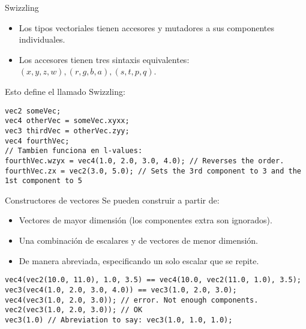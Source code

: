 \begin{frame}[fragile]{Swizzling}
\begin{itemize}
    \item Los tipos vectoriales tienen accesores y mutadores a sus componentes individuales.
    \item Los accesores tienen tres sintaxis equivalentes: $(x, y, z, w), (r, g, b, a), (s, t, p, q)$.
\end{itemize}
Esto define el llamado Swizzling:
\begin{listing}
\begin{verbatim}
vec2 someVec;
vec4 otherVec = someVec.xyxx;
vec3 thirdVec = otherVec.zyy;
vec4 fourthVec;
// Tambien funciona en l-values:
fourthVec.wzyx = vec4(1.0, 2.0, 3.0, 4.0); // Reverses the order.
fourthVec.zx = vec2(3.0, 5.0); // Sets the 3rd component to 3 and the 1st component to 5
\end{verbatim}
\end{listing}
\end{frame}

\begin{frame}[fragile]{Constructores de vectores}
Se pueden construir a partir de:
\begin{itemize}
    \item Vectores de mayor dimensión (los componentes extra son ignorados).
    \item Una combinación de escalares y de vectores de menor dimensión.
    \item De manera abreviada, especificando un solo escalar que se repite.
\end{itemize}
\begin{listing}
\begin{verbatim}
vec4(vec2(10.0, 11.0), 1.0, 3.5) == vec4(10.0, vec2(11.0, 1.0), 3.5);
vec3(vec4(1.0, 2.0, 3.0, 4.0)) == vec3(1.0, 2.0, 3.0);
vec4(vec3(1.0, 2.0, 3.0)); // error. Not enough components.
vec2(vec3(1.0, 2.0, 3.0)); // OK
vec3(1.0) // Abreviation to say: vec3(1.0, 1.0, 1.0);
\end{verbatim}
\end{listing}
\end{frame}


